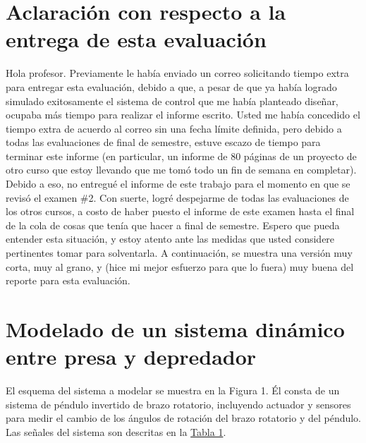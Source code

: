 \section{Aclaración con respecto a la entrega de esta evaluación}
Hola profesor.
Previamente le había enviado un correo solicitando tiempo extra para entregar
esta evaluación, debido a que, a pesar de que ya había logrado simulado exitosamente
el sistema de control que me había planteado diseñar, ocupaba más tiempo para realizar
el informe escrito.
Usted me había concedido el tiempo extra de acuerdo al correo sin una fecha límite definida, pero debido a todas las evaluaciones
de final de semestre, estuve escazo de tiempo para terminar este informe (en particular, un informe de 80 páginas de un proyecto de otro curso
que estoy llevando que me tomó todo un fin de semana en completar).
Debido a eso, no entregué el informe de este trabajo para el momento en que se revisó el examen \#2.
Con suerte, logré despejarme de todas las evaluaciones de los otros cursos, a costo de haber puesto el informe de este examen
hasta el final de la cola de cosas que tenía que hacer a final de semestre.
Espero que pueda entender esta situación, y estoy atento ante las medidas que usted considere pertinentes 
tomar para solventarla.
A continuación, se muestra una versión muy corta, muy al grano, y (hice mi mejor esfuerzo para que lo fuera) muy buena del reporte para esta evaluación.

\section{Modelado de un sistema dinámico entre presa y depredador}
El esquema del sistema a modelar se muestra en la Figura 1.
Él consta de un sistema de péndulo invertido de brazo rotatorio, incluyendo actuador y sensores
para medir el cambio de los ángulos de rotación del brazo rotatorio y del péndulo.
Las señales del sistema son descritas en la \hyperref[t1]{Tabla 1}.

